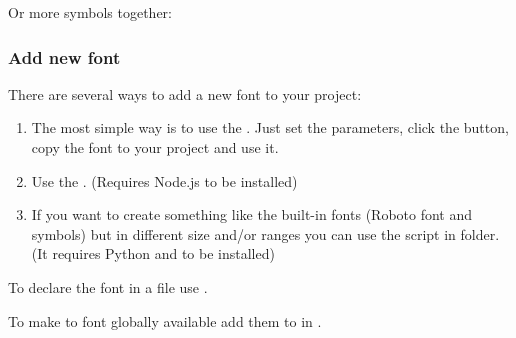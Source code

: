 \documentclass[letterpaper,10pt,english]{sphinxmanual}
\begin{document}
Or more symbols together:

\begin{sphinxVerbatim}[commandchars=\\\{\}]
   
\end{sphinxVerbatim}


\subsubsection{Add new font}
\label{\detokenize{overview/fonts:add-new-font}}
There are several ways to add a new font to your project:
\begin{enumerate}
\def\theenumi{\arabic{enumi}}
\def\labelenumi{\theenumi .}
\makeatletter\def\p@enumii{\p@enumi \theenumi .}\makeatother
\item {} 
The most simple way is to use the . Just set the parameters, click the  button, copy the font to your project and use it.

\item {} 
Use the . (Requires Node.js to be installed)

\item {} 
If you want to create something like the built-in fonts (Roboto font and symbols) but in different size and/or ranges you can use the  script in  folder.
(It requires Python and  to be installed)

\end{enumerate}

To declare the font in a file use .

To make to font globally available add them to  in .
\end{document}
